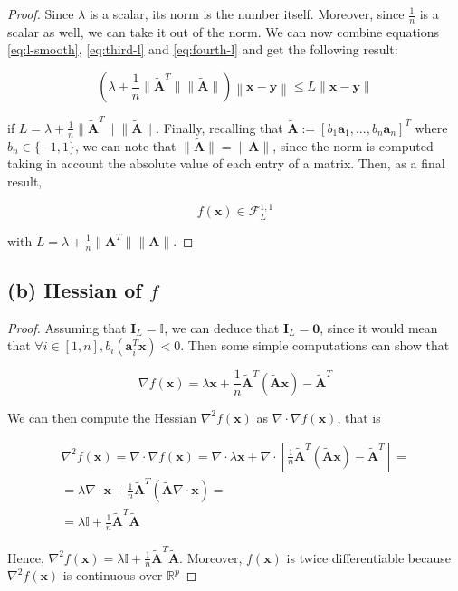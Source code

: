 \documentclass[12pt]{article}
\newcommand{\xb}{\mathbf{x}}
\newcommand{\yb}{\mathbf{y}}
\newcommand{\ab}{\mathbf{a}}
\newcommand{\abi}{\ab_i}
\newcommand{\atilde}{\mathbf{\tilde{A}}}
\newcommand{\id}{\mathbf{I}}
\begin{document}
\begin{proof}
Since $\lambda$ is a scalar, its norm is the number itself. Moreover, since $\frac{1}{n}$ is a scalar as well, we can take it out of the norm. We can now combine equations \ref{eq:l-smooth}, \ref{eq:third-l} and \ref{eq:fourth-l} and get the following result:

\begin{equation}
    \left ( \lambda + \frac{1}{n} \lVert \atilde^T \rVert \lVert \atilde \rVert \right ) \left \lVert \xb - \yb \right \rVert \leq L \lVert \xb - \yb \rVert
\end{equation}

if $L = \lambda + \frac{1}{n} \lVert \atilde^T \rVert \lVert \atilde \rVert$. Finally, recalling that $\atilde:=[b_1\ab_1, ..., b_n\ab_n]^T$ where $b_n \in \{-1, 1\}$, we can note that $\lVert \atilde \rVert = \lVert \mathbf{A} \rVert$, since the norm is computed taking in account the absolute value of each entry of a matrix. Then, as a final result,

\begin{equation}
    f(\xb) \in \mathcal{F}_{L}^{1, 1}
\end{equation}

with $L = \lambda + \frac{1}{n} \lVert \mathbf{A}^T \rVert \lVert \mathbf{A} \rVert$.


\end{proof}

\subsection*{(b) Hessian of $f$}
\begin{proof}
Assuming that $\id_L = \mathbb{I}$, we can deduce that $\id_L = \mathbf{0}$, since it would mean that $\forall i \in [1, n], b_i(\abi^T\xb) < 0$. Then some simple computations can show that

\begin{equation}
    \nabla f(\xb) = \lambda \xb + \frac{1}{n} \atilde^T(\atilde\xb) - \atilde^T
\end{equation}

We can then compute the Hessian $\nabla^2 f(\xb)$ as $\nabla \cdot \nabla f(\xb)$, that is

\begin{gather}
    \nabla^2 f(\xb) = \nabla \cdot \nabla f(\xb) = \nabla \cdot \lambda \xb + \nabla \cdot \left [ \frac{1}{n} \atilde^T(\atilde\xb) - \atilde^T \right ] \nonumber = \\
    = \lambda \nabla \cdot \xb + \frac{1}{n} \atilde^T (\atilde \nabla \cdot \xb) = \nonumber \\
    = \lambda \mathbb{I} + \frac{1}{n} \atilde^T \atilde
\end{gather}

Hence, $\nabla^2 f(\xb) = \lambda \mathbb{I} + \frac{1}{n} \atilde^T \atilde$. Moreover, $f(\xb)$ is twice differentiable because $\nabla ^2 f(\xb)$ is continuous over $\mathbb{R}^p$

\end{proof}
\end{document}
